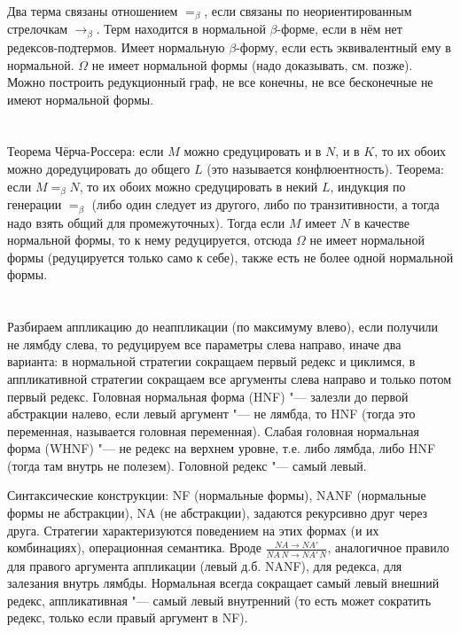 Два терма связаны отношением $=_\beta$, если связаны по неориентированным стрелочкам $\to_\beta$.
Терм находится в нормальной $\beta$-форме, если в нём нет редексов-подтермов.
Имеет нормальную $\beta$-форму, если есть эквивалентный ему в нормальной.
$\Omega$ не имеет нормальной формы (надо доказывать, см. позже).
Можно построить редукционный граф, не все конечны, не все бесконечные не имеют нормальной формы.

\section{} %
Теорема Чёрча-Россера: если $M$ можно средуцировать и в $N$, и в $K$, то их обоих можно доредуцировать
до общего $L$ (это называется конфлюентность).
Теорема: если $M=_\beta N$, то их обоих можно средуцировать в некий $L$,
индукция по генерации $=_\beta$ (либо один следует из другого, либо по транзитивности,
а тогда надо взять общий для промежуточных).
Тогда если $M$ имеет $N$ в качестве нормальной формы, то к нему редуцируется, отсюда
$\Omega$ не имеет нормальной формы (редуцируется только само к себе),
также есть не более одной нормальной формы.

\section{} %
Разбираем аппликацию до неаппликации (по максимуму влево), если получили
не лямбду слева, то редуцируем все параметры слева направо,
иначе два варианта: в нормальной стратегии сокращаем первый редекс и циклимся,
в аппликативной стратегии сокращаем все аргументы слева направо и только потом первый редекс.
Головная нормальная форма (HNF) "--- залезли до первой абстракции налево, если левый аргумент "--- не лямбда, то HNF (тогда
это переменная, называется головная переменная).
Слабая головная нормальная форма (WHNF) "--- не редекс на верхнем уровне, т.е. либо лямбда, либо HNF (тогда там внутрь не полезем).
Головной редекс "--- самый левый.

Синтаксические конструкции: NF (нормальные формы), NANF (нормальные формы не абстракции), NA (не абстракции),
задаются рекурсивно друг через друга.
Стратегии характеризуются поведением на этих формах (и их комбинациях), операционная семантика.
Вроде $\frac{NA \to NA'}{NA\, N \to NA'\, N}$, аналогичное правило для правого аргумента аппликации (левый д.б. NANF),
для редекса, для залезания внутрь лямбды.
Нормальная всегда сокращает самый левый внешний редекс,
аппликативная "--- самый левый внутренний (то есть может сократить редекс, только если правый аргумент в NF).

